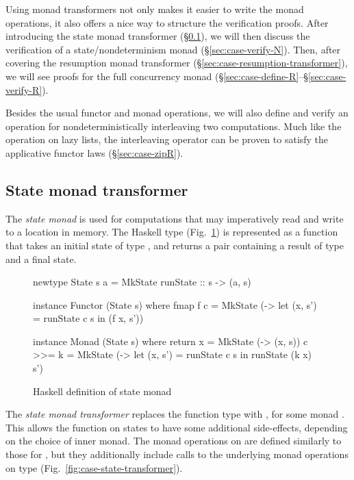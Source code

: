 Using monad transformers not only makes it easier to write the monad operations, it also offers a nice way to structure the verification proofs. After introducing the state monad transformer (\S\ref{sec:case-state-transformer}), we will then discuss the verification of a state/nondeterminism monad (\S\ref{sec:case-verify-N}). Then, after covering the resumption monad transformer (\S\ref{sec:case-resumption-transformer}), we will see proofs for the full concurrency monad (\S\ref{sec:case-define-R}--\S\ref{sec:case-verify-R}).

Besides the usual functor and monad operations, we will also define and verify an operation for nondeterministically interleaving two computations. Much like the  operation on lazy lists, the interleaving operator can be proven to satisfy the applicative functor laws (\S\ref{sec:case-zipR}).

\subsection{State monad transformer}
\label{sec:case-state-transformer}

The \emph{state monad} is used for computations that may imperatively read and write to a location in memory. The Haskell type  (Fig.~\ref{fig:case-state-monad}) is represented as a function that takes an initial state of type , and returns a pair containing a result of type  and a final state.

\begin{figure}
\begin{hscode}
newtype State s a = MkState { runState :: s -> (a, s) }
\end{hscode}
\begin{hscode}
instance Functor (State s) where
  fmap f c = MkState
    (\s -> let (x, s') = runState c s in (f x, s'))
\end{hscode}
\begin{hscode}
instance Monad (State s) where
  return x = MkState (\s -> (x, s))
  c >>= k = MkState
    (\s -> let (x, s') = runState c s in runState (k x) s')
\end{hscode}
\caption{Haskell definition of state monad}
\label{fig:case-state-monad}
\end{figure}

The \emph{state monad transformer} replaces the function type  with , for some monad . This allows the function on states to have some additional side-effects, depending on the choice of inner monad. The monad operations on  are defined similarly to those for , but they additionally include calls to the underlying monad operations on type   (Fig.~\ref{fig:case-state-transformer}).

